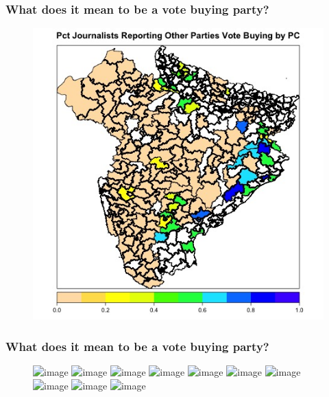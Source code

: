 \documentclass{beamer}
\begin{document}
\begin{frame}
\frametitle{What does it mean to be a vote buying party?}

\begin{figure}
\centering
\includegraphics[width=.6\textwidth]{../Figures/oth_vb_map}
\end{figure}

\end{frame}




\begin{frame}
\frametitle{What does it mean to be a vote buying party?}

\begin{figure}
\centering
\includegraphics<1>[width=.6\textwidth]{../Figures/new_vb_defn_0}
\includegraphics<2>[width=.6\textwidth]{../Figures/new_vb_defn_1}
\includegraphics<3>[width=.6\textwidth]{../Figures/new_vb_defn_2}
\includegraphics<4>[width=.6\textwidth]{../Figures/new_vb_defn_3}
\includegraphics<5>[width=.6\textwidth]{../Figures/new_vb_defn_4}
\includegraphics<6>[width=.6\textwidth]{../Figures/new_vb_defn_5}
\includegraphics<7>[width=.6\textwidth]{../Figures/new_vb_defn_6}
\includegraphics<8>[width=.6\textwidth]{../Figures/new_vb_defn_7}
\includegraphics<9>[width=.6\textwidth]{../Figures/new_vb_defn_8}
\includegraphics<10>[width=.6\textwidth]{../Figures/new_vb_defn_9}
\end{figure}

\end{frame}
\end{document}
